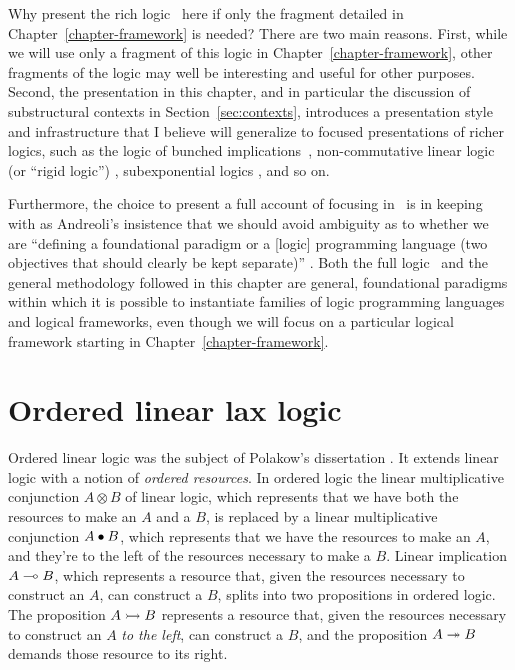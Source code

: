 Why present the rich logic \ollll~here
if only the fragment detailed in Chapter~\ref{chapter-framework} 
is needed? There are two
main reasons.  First, while we will use only a fragment of this logic
in Chapter~\ref{chapter-framework}, 
other fragments of the logic may well be interesting and
useful for other purposes. Second, the presentation in this chapter,
and in particular the discussion of substructural contexts in
Section~\ref{sec:contexts}, introduces a presentation style and
infrastructure that I believe will generalize to focused presentations
of richer logics, such as the logic of bunched
implications~\cite{pym02semantics}, non-commutative linear logic (or
``rigid logic'') \cite{simmons09linear}, subexponential logics
\cite{nigam09algorithmic}, and so on.

Furthermore, the choice to present a full account of focusing in
\ollll~is in keeping with as Andreoli's insistence that we should
avoid ambiguity as to whether we are ``defining a foundational
paradigm or a [logic] programming language (two objectives that should
clearly be kept separate)'' \cite{andreoli01focussing}. Both the full
logic \ollll~and the general methodology followed in this chapter are
general, foundational paradigms within which it is possible to
instantiate families of logic programming languages and logical
frameworks, even though we will focus on a particular logical
framework starting in Chapter~\ref{chapter-framework}.

\section{Ordered linear lax logic}
\label{sec:ord-unfocused}

Ordered linear logic was the subject of Polakow's dissertation
\cite{polakow01ordered}. It extends linear logic with a notion of {\it
  ordered resources}.  In ordered logic the linear
multiplicative conjunction $A \otimes B$ of linear logic, which
represents that we have both the resources to make an $A$ and a $B$,
is replaced by a linear multiplicative conjunction $A \mathbin{\bullet} B$, which
represents that we have the resources to make an $A$, and they're to
the left of the resources necessary to make a $B$. Linear implication
$A \multimap B$, which represents a resource that, given the resources
necessary to construct an $A$, can construct a $B$, splits into two
propositions in ordered logic. The proposition $A \rightarrowtail B$ represents
a resource that, given the resources necessary to construct an $A$
{\it to the left}, can construct a $B$, and the proposition $A \twoheadrightarrow
B$ demands those resource to its right. 

